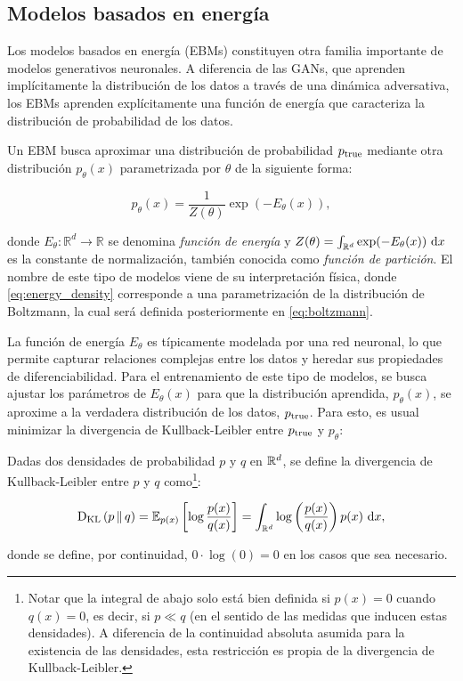 \subsection{Modelos basados en energía}
\label{dm/generative_models/ebm}

Los modelos basados en energía (EBMs) constituyen otra familia importante de modelos generativos neuronales. A diferencia de las GANs, que aprenden implícitamente la distribución de los datos a través de una dinámica adversativa, los EBMs aprenden explícitamente una función de energía que caracteriza la distribución de probabilidad de los datos.

Un EBM busca aproximar una distribución de probabilidad $p_{\operatorname{true}}$ mediante otra distribución $p_\theta(x)$ parametrizada por $\theta$ de la siguiente forma:

\begin{equation}
    \label{eq:energy_density}
    p_\theta(x) = \frac{1}{Z(\theta)} \exp(-E_\theta(x)),
\end{equation}

donde $E_\theta: \mathbb{R}^d \to \mathbb{R}$ se denomina \textit{función de energía} y $Z(\theta) = \int_{\mathbb{R}^d} \exp(-E_\theta(x)) \,\operatorname{d}\! x$ es la constante de normalización, también conocida como \textit{función de partición}. El nombre de este tipo de modelos viene de su interpretación física, donde \eqref{eq:energy_density} corresponde a una parametrización de la distribución de Boltzmann, la cual será definida posteriormente en \eqref{eq:boltzmann}.

La función de energía $E_\theta$ es típicamente modelada por una red neuronal, lo que permite capturar relaciones complejas entre los datos y heredar sus propiedades de diferenciabilidad. Para el entrenamiento de este tipo de modelos, se busca ajustar los parámetros de $E_\theta(x)$ para que la distribución aprendida, $p_\theta(x)$, se aproxime a la verdadera distribución de los datos, $p_{\operatorname{true}}$. Para esto, es usual minimizar la divergencia de Kullback-Leibler entre $p_{\operatorname{true}}$ y $p_\theta$:

\begin{defn}
    \label{defn:kl_ac}
    Dadas dos densidades de probabilidad $p$ y $q$ en $\mathbb{R}^d$, se define la divergencia de Kullback-Leibler entre $p$ y $q$ como\footnote{Notar que la integral de abajo solo está bien definida si $p(x)=0$ cuando $q(x)=0$, es decir, si $p\ll q$ (en el sentido de las medidas que inducen estas densidades). A diferencia de la continuidad absoluta asumida para la existencia de las densidades, esta restricción es propia de la divergencia de Kullback-Leibler.}:


    \begin{equation*}
        \operatorname{D_{KL}}\left(p\,\|\,q\right)
        = \mathbb{E}_{p(x)}\left[\log \frac{p(x)}{q(x)}\right]
        = \int_{\mathbb{R}^d} \log\left(\frac{p(x)}{q(x)}\right)p(x) \,\operatorname{d}\! x,
    \end{equation*}

    donde se define, por continuidad, $0\cdot\log(0)=0$ en los casos que sea necesario.
\end{defn}

